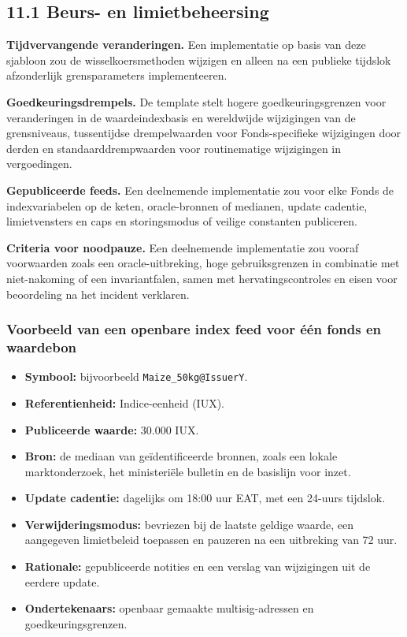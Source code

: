 \documentclass[11pt]{article}
\begin{document}
\subsection*{11.1 Beurs- en limietbeheersing}

\textbf{Tijdvervangende veranderingen.} Een implementatie op basis van deze sjabloon zou de wisselkoersmethoden wijzigen en alleen na een publieke tijdslok afzonderlijk grensparameters implementeeren.

\textbf{Goedkeuringsdrempels.} De template stelt hogere goedkeuringsgrenzen voor veranderingen in de waardeindexbasis en wereldwijde wijzigingen van de grensniveaus, tussentijdse drempelwaarden voor Fonds-specifieke wijzigingen door derden en standaarddrempwaarden voor routinematige wijzigingen in vergoedingen.

\textbf{Gepubliceerde feeds.} Een deelnemende implementatie zou voor elke Fonds de indexvariabelen op de keten, oracle-bronnen of medianen, update cadentie, limietvensters en caps en storingsmodus of veilige constanten publiceren.

\textbf{Criteria voor noodpauze.} Een deelnemende implementatie zou vooraf voorwaarden zoals een oracle-uitbreking, hoge gebruiksgrenzen in combinatie met niet-nakoming of een invariantfalen, samen met hervatingscontroles en eisen voor beoordeling na het incident verklaren.

\subsubsection*{Voorbeeld van een openbare index feed voor één fonds en waardebon}

\begin{itemize}[leftmargin=*]
\item \textbf{Symbool:} bijvoorbeeld \texttt{Maize\_50kg@IssuerY}.
\item \textbf{Referentienheid:} Indice-eenheid (IUX).
\item \textbf{Publiceerde waarde:} 30.000 IUX.
\item \textbf{Bron:} de mediaan van geïdentificeerde bronnen, zoals een lokale marktonderzoek, het ministeriële bulletin en de basislijn voor inzet.
\item \textbf{Update cadentie:} dagelijks om 18:00 uur EAT, met een 24-uurs tijdslok.
\item \textbf{Verwijderingsmodus:} bevriezen bij de laatste geldige waarde, een aangegeven limietbeleid toepassen en pauzeren na een uitbreking van 72 uur.
\item \textbf{Rationale:} gepubliceerde notities en een verslag van wijzigingen uit de eerdere update.
\item \textbf{Ondertekenaars:} openbaar gemaakte multisig-adressen en goedkeuringsgrenzen.
\end{itemize}
\end{document}
